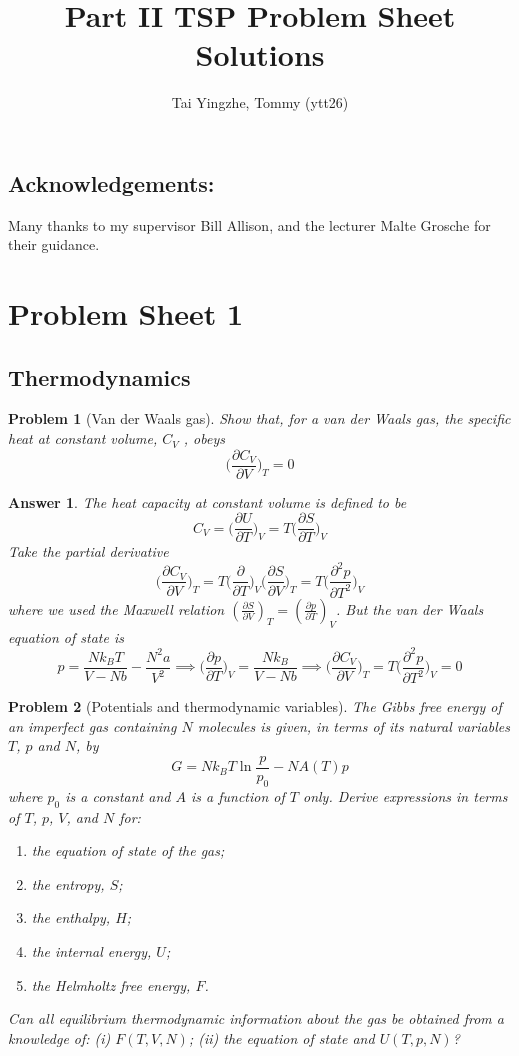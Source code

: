 \documentclass[a4paper]{article}
\title{\textbf{Part II TSP Problem Sheet Solutions}}
\author{Tai Yingzhe, Tommy (ytt26)}
\date{}
\theoremstyle{new2}
\newtheorem{ans}{Answer}[section]
\theoremstyle{new}
\newtheorem{qns}{Problem}[section]
\begin{document}
\maketitle
\tableofcontents
\subsection*{Acknowledgements:}
Many thanks to my supervisor Bill Allison, and the lecturer Malte Grosche for their guidance. 
\newpage
\section{Problem Sheet 1}
\subsection*{Thermodynamics}
\begin{qns}[Van der Waals gas]
Show that, for a van der Waals gas, the specific heat at constant volume, $C_V$ , obeys 
$$\bigg(\frac{\partial C_V}{\partial V}\bigg)_T=0$$
\end{qns}
\begin{ans}
The heat capacity at constant volume is defined to be
$$C_V=\bigg(\frac{\partial U}{\partial T}\bigg)_V=T\bigg(\frac{\partial S}{\partial T}\bigg)_V$$
Take the partial derivative
$$\bigg(\frac{\partial C_V}{\partial V}\bigg)_T=T\bigg(\frac{\partial}{\partial T}\bigg)_V\bigg(\frac{\partial S}{\partial V}\bigg)_T=T\bigg(\frac{\partial^2p}{\partial T^2}\bigg)_V$$
where we used the Maxwell relation $(\frac{\partial S}{\partial V})_T=(\frac{\partial p}{\partial T})_V$. But the van der Waals equation of state is
$$p=\frac{Nk_BT}{V-Nb}-\frac{N^2a}{V^2}\implies\bigg(\frac{\partial p}{\partial T}\bigg)_V=\frac{Nk_B}{V-Nb}\implies\bigg(\frac{\partial C_V}{\partial V}\bigg)_T=T\bigg(\frac{\partial^2p}{\partial T^2}\bigg)_V=0$$
\end{ans}
\begin{qns}[Potentials and thermodynamic variables]
The Gibbs free energy of an imperfect gas containing $N$ molecules is given, in terms of its natural variables $T$, $p$ and $N$, by
$$G=Nk_BT\ln\frac{p}{p_0}-NA(T)p$$
where $p_0$ is a constant and $A$ is a function of $T$ only. Derive expressions in terms of $T$, $p$, $V$, and $N$ for:
\begin{enumerate}[label=(\alph*)]
\item the equation of state of the gas;
\item the entropy, $S$;
\item the enthalpy, $H$;
\item the internal energy, $U$;
\item the Helmholtz free energy, $F$.
\end{enumerate}
Can all equilibrium thermodynamic information about the gas be obtained from a knowledge of: (i) $F(T, V, N)$; (ii) the equation of state and $U(T, p, N)$?
\end{qns}
\end{document}

